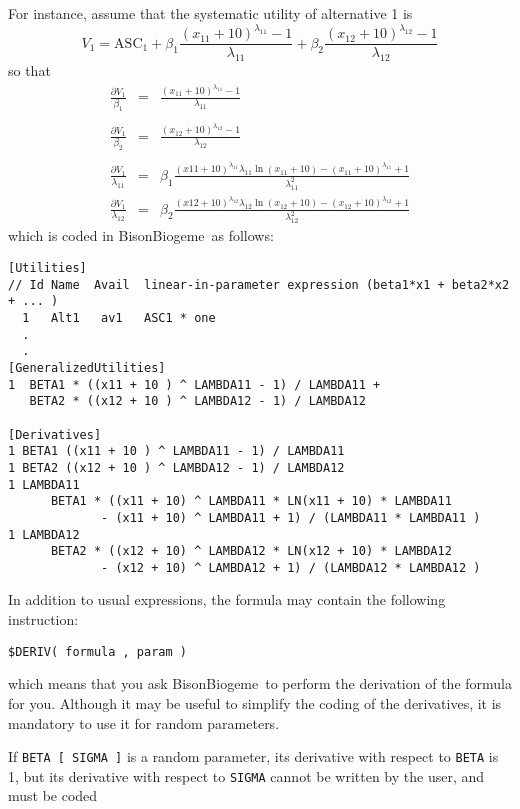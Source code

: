 \documentclass[12pt,a4paper]{article}
\newcommand{\BBIOGEME}{BisonBiogeme}
\begin{document}
\begin{description}
For instance, assume that the systematic utility of alternative 1 is 
\[
V_1 = \text{ASC}_1 + \beta_1 \frac{(x_{11} + 10 )^{\lambda_{11}} - 1}{\lambda_{11}} + \beta_2  \frac{(x_{12} + 10 )^{\lambda_{12}} - 1}{\lambda_{12}}
\]
so that
\[
\begin{array}{rcl}
\displaystyle\frac{\partial V_1}{\beta_1} &=&  \displaystyle\frac{(x_{11} + 10 )^{\lambda_{11}} - 1}{\lambda_{11}}\\&&\\
\displaystyle\frac{\partial V_1}{\beta_2} &=&   \displaystyle\frac{(x_{12} + 10 )^{\lambda_{12}} - 1}{\lambda_{12}} \\&&\\
\displaystyle\frac{\partial V_1}{\lambda_{11}} &=&  \displaystyle\beta_1 \frac{(x11 + 10)^{\lambda_{11}} \lambda_{11}   \ln(x_{11} + 10)  
             - (x_{11} + 10)^{\lambda_{11}} + 1}{\lambda^2_{11}} \\
\displaystyle\frac{\partial V_1}{\lambda_{12}} &=&  \displaystyle\beta_2 \frac{(x12 + 10)^{\lambda_{12}} \lambda_{12}   \ln(x_{12} + 10)  
             - (x_{12} + 10)^{\lambda_{12}} + 1}{\lambda^2_{12}}
         \end{array}
\]
which is coded in \BBIOGEME\ as follows: 
\begin{verbatim}
[Utilities]
// Id Name  Avail  linear-in-parameter expression (beta1*x1 + beta2*x2 + ... )
  1   Alt1   av1   ASC1 * one 
  .
  .
[GeneralizedUtilities]
1  BETA1 * ((x11 + 10 ) ^ LAMBDA11 - 1) / LAMBDA11 + 
   BETA2 * ((x12 + 10 ) ^ LAMBDA12 - 1) / LAMBDA12

[Derivatives]
1 BETA1 ((x11 + 10 ) ^ LAMBDA11 - 1) / LAMBDA11
1 BETA2 ((x12 + 10 ) ^ LAMBDA12 - 1) / LAMBDA12
1 LAMBDA11 
      BETA1 * ((x11 + 10) ^ LAMBDA11 * LN(x11 + 10) * LAMBDA11 
             - (x11 + 10) ^ LAMBDA11 + 1) / (LAMBDA11 * LAMBDA11 )
1 LAMBDA12 
      BETA2 * ((x12 + 10) ^ LAMBDA12 * LN(x12 + 10) * LAMBDA12 
             - (x12 + 10) ^ LAMBDA12 + 1) / (LAMBDA12 * LAMBDA12 )
\end{verbatim}


In addition to usual  expressions, the formula may contain the following instruction:
\begin{verbatim}
$DERIV( formula , param )
\end{verbatim}
which means that you ask \BBIOGEME\ to perform the derivation of the
formula for you. Although it may be useful to simplify the coding of
the derivatives, it is mandatory to use it for random parameters.

If \verb+BETA [ SIGMA ]+ is a random parameter, its derivative with
respect to \verb+BETA+ is 1, but its derivative with respect to
\verb+SIGMA+ cannot be written by the user, and must be coded


\end{description}
\end{document}

